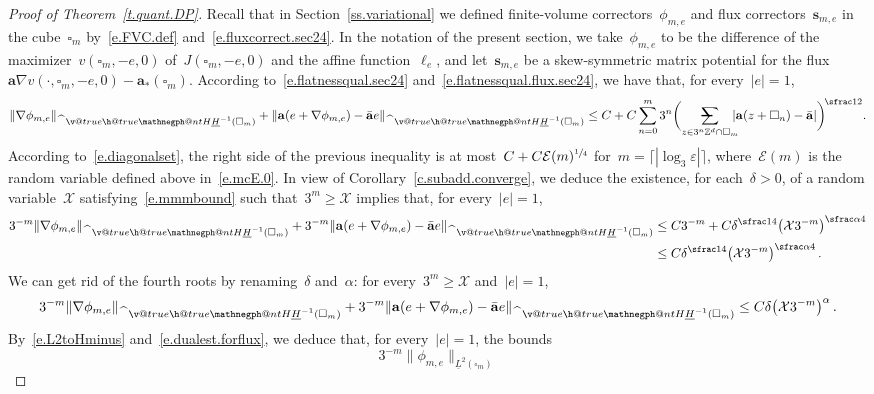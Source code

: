 \documentclass[11pt]{article} %
\makeatletter
\let\oldsquare\square %
\renewcommand{\square}{\oldsquare}
\numberwithin{equation}{section}
\theoremstyle{definition}
\newcommand*{\Zd}{\ensuremath{\mathbb{Z}^d}}
\newcommand{\eps}{\varepsilon}
\renewcommand*{\hat}{\widehat}
\newcommand{\s}{\mathbf{s}}
\newcommand{\ep}{\eps}
\renewcommand{\a}{\mathbf{a}}
\newcommand{\ahom}{\bar{\a}}
\newcommand{\cu}{\square}
\newcommand{\X}{\mathcal{X}}
\newcommand{\avsum}{\mathop{\mathpalette\avsuminner\relax}\displaylimits}
\newcommand\avsuminner[2]{%
  {\sbox0{$\m@th#1\sum$}%
   \vphantom{\usebox0}%
   \ooalign{%
     \hidewidth
     \smash{\,\rule[.23em]{8.8pt}{1.1pt} \relax}%
     \hidewidth\cr
     $\m@th#1\sum$\cr
   }%
  }%
}
\newcommand{\negphantom}{\v@true\h@true\negph@nt}
\newcommand{\negph@nt}{\ifmmode\expandafter\mathpalette 
  \expandafter\mathnegph@nt\else\expandafter\makenegph@nt\fi}
\newcommand{\makenegph@nt}[1]{%
  \setbox\z@\hbox{\color@begingroup#1\color@endgroup}\finnegph@nt}
\newcommand{\finnegph@nt}{%
  \setbox\tw@\null 
  \ifv@ \ht\tw@\ht\z@\dp\tw@\dp\z@\fi \ifh@\wd\tw@-\wd\z@\fi\box\tw@}
\newcommand{\mathnegph@nt}[2]{%
  \setbox\z@\hbox{$\m@th #1{#2}$}\finnegph@nt}
\newcommand{\Hminusul}{\hat{\phantom{H}}\negphantom{H}\underline{H}^{-1}}
\makeatother
\begin{document}
\begin{proof}[{Proof of Theorem~\ref{t.quant.DP}}]
Recall that in Section~\ref{ss.variational} we defined finite-volume correctors~$\phi_{m,e}$ and flux correctors~$\s_{m,e}$ in the cube~$\cu_m$ by~\eqref{e.FVC.def} and~\eqref{e.fluxcorrect.sec24}.
In the notation of the present section, we take~$\phi_{m,e}$ to be the difference of the maximizer~$v(\cu_m,-e,0)$ of~$J(\cu_m,-e,0)$ and the affine function~$\ell_e$, and let~$\s_{m,e}$ be a skew-symmetric matrix potential for the flux~$\a\nabla v(\cdot,\cu_m, -e,0) - \a_*(\cu_m)$. 
According to~\eqref{e.flatnessqual.sec24} and~\eqref{e.flatnessqual.flux.sec24},
we have that, for every~$|e|=1$,
\begin{equation*}
\| \nabla \phi_{m,e} \|_{\Hminusul(\cu_m)} 
+
\| \a (e +\nabla \phi_{m,e}) - \ahom e \|_{\Hminusul(\cu_m)} 
\leq
C 
+ 
C
\sum_{n=0}^{{m}} 3^{n} 
\biggl( \avsum_{z\in 3^n\Zd\cap \cu_{m}}  \!\!\!\!
| \a(z+\cu_n)
-
\ahom |
\biggr)^{\!\sfrac12}
.
\end{equation*}
According to~\eqref{e.diagonalset}, the right side of the previous inequality is at most~$C+C\mathcal{E}(m)^{\sfrac14}$ for~$m = \lceil |\log_3 \ep| \rceil$, where~$\mathcal{E}(m)$ is the random variable defined above in~\eqref{e.mcE.0}.
In view of Corollary~\ref{c.subadd.converge}, we deduce the existence, for each~$\delta>0$, of a random variable~$\X$ satisfying~\eqref{e.mmmbound} such that~$3^{m} \geq \X$ implies that, for every~$|e|=1$, 
\begin{align*}
3^{-m}\| \nabla \phi_{m,e} \|_{\Hminusul(\cu_m)} 
+
3^{-m} \| \a (e +\nabla \phi_{m,e}) - \ahom e \|_{\Hminusul(\cu_m)} 
&
\leq
C3^{-m}  
+ 
C \delta^{\sfrac14} \bigl( \X 3^{-m} \bigr)^{\sfrac\alpha4}
\\ & 
\leq 
C \delta^{\sfrac14} \bigl( \X 3^{-m} \bigr)^{\sfrac\alpha4}
\,.
\end{align*}
We can get rid of the fourth roots by renaming~$\delta$ and~$\alpha$: for every~$3^m \geq \X$ and~$|e|=1$,
\begin{equation}
\label{e.FV.sublinearity}
3^{-m}\| \nabla \phi_{m,e} \|_{\Hminusul(\cu_m)} 
+
3^{-m} \| \a (e +\nabla \phi_{m,e}) - \ahom e \|_{\Hminusul(\cu_m)} 
\leq 
C \delta \bigl( \X 3^{-m} \bigr)^{\alpha}
\,.
\end{equation}
By~\eqref{e.L2toHminus} and~\eqref{e.dualest.forflux}, we deduce that, for every~$|e|=1$, the bounds
\begin{equation}
\label{e.fvc.bounds.symm}
3^{-m} \| \phi_{m,e} \|_{\underline{L}^2(\cu_m)} 

\end{equation}
\end{proof}
\end{document}
